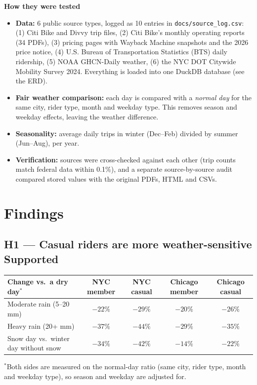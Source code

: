\documentclass[11pt,a4paper]{article}
\begin{document}
\textbf{How they were tested}
\begin{itemize}
\item \textbf{Data:} 6 public source types, logged as 10 entries in \texttt{docs/source\_log.csv}: (1) Citi Bike and Divvy trip files, (2) Citi Bike's monthly operating reports (34 PDFs), (3) pricing pages with Wayback Machine snapshots and the 2026 price notice, (4) U.S. Bureau of Transportation Statistics (BTS) daily ridership, (5) NOAA GHCN-Daily weather, (6) the NYC DOT Citywide Mobility Survey 2024. Everything is loaded into one DuckDB database (see the ERD).
\item \textbf{Fair weather comparison:} each day is compared with a \emph{normal day} for the same city, rider type, month and weekday type. This removes season and weekday effects, leaving the weather difference.
\item \textbf{Seasonality:} average daily trips in winter (Dec--Feb) divided by summer (Jun--Aug), per year.
\item \textbf{Verification:} sources were cross-checked against each other (trip counts match federal data within 0.1\%), and a separate source-by-source audit compared stored values with the original PDFs, HTML and CSVs.
\end{itemize}

\section{Findings}

\subsection*{H1 --- Casual riders are more weather-sensitive \hfill \textcolor{accent}{Supported}}
\begin{tabularx}{\linewidth}{@{}lCCCC@{}}
\toprule
Change vs.\ a dry day$^{*}$ & NYC member & NYC casual & Chicago member & Chicago casual \\
\midrule
Moderate rain (5--20 mm) & $-22\%$ & $-29\%$ & $-20\%$ & $-26\%$ \\
Heavy rain (20+ mm) & $-37\%$ & $-44\%$ & $-29\%$ & $-35\%$ \\
Snow day vs.\ winter day without snow & $-34\%$ & $-42\%$ & $-14\%$ & $-22\%$ \\
\bottomrule
\end{tabularx}

{\small $^{*}$Both sides are measured on the normal-day ratio (same city, rider type, month and weekday type), so season and weekday are adjusted for.}
\end{document}
